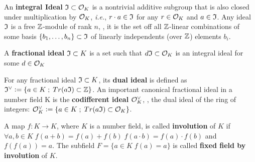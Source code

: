 \documentclass[a4paper,12pt]{article}
\begin{document}
\begin{definition}
  An \textbf{integral Ideal} $\mathfrak{I} \subset \mathcal{O}_K$ is a  nontrivial additive subgroup that
  is also closed under multiplication by $\mathcal{O}_K$, \textit{i.e.}, $r \cdot a \in \mathfrak{I}$ for
  any $r \in \mathcal{O}_K$ and $a \in \mathfrak{I}$. Any ideal $\mathfrak{I}$ is a free $\mathbb{Z}$-module of rank
  $n$, \ie, it is the set off all $\mathbb{Z}$-linear combinations of some basis
  $\{b_1,\dots,b_n\} \subset \mathfrak{I}$  of linearly independents (over $\mathbb{Z}$) elements $b_i$.
\end{definition}

\begin{definition}
  A \textbf{fractional ideal} $\mathfrak{I} \subset K$ is a set such that $d\mathfrak{I} \subset \mathcal{O}_K$ is an
  integral ideal for some $d \in \mathcal{O}_K$
\end{definition}

\begin{definition}
  For any fractional ideal $\mathfrak{I} \subset K$, its \textbf{dual ideal} is defined as
  $\mathfrak{I}^\vee \vcentcolon = \{ a \in K \;;\; Tr(a\mathfrak{I}) \subset \mathbb{Z} \}$. An important canonical
  fractional ideal in a number field K is the \textbf{codifferent ideal}
  $\mathcal{O}_K^\vee$, \ie, the dual ideal of the ring of integers: $\mathcal{O}_K^\vee \vcentcolon = \{ a \in K \;;\; Tr(a\mathfrak{I}) \subset \mathcal{O}_K \}$.
\end{definition}

   \begin{definition}
\label{definition:fixed-field-by-involution}
     A map $f: K \rightarrow K$, where $K$ is a number field, is called \textbf{involution}
     of $K$ if $\forall a,b \in K \; f(a+b) = f(a) + f(b) \; f(a \cdot b) = f(a) \cdot f(b)$ and
     $f(f(a)) = a$. The subfield $F = \{a \in K \; f(a) = a\}$ is called \textbf{fixed field by
       involution} of $K$.
   \end{definition}
\end{document}
